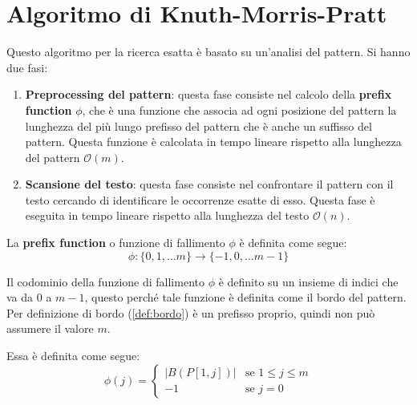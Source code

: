\section{Algoritmo di Knuth-Morris-Pratt}
Questo algoritmo per la ricerca esatta è basato su un'analisi del pattern. Si
hanno due fasi:
\begin{enumerate}
    \item \textbf{Preprocessing del pattern}: questa fase consiste nel calcolo
          della \textbf{prefix function} $\phi$, che è una funzione che associa
          ad ogni posizione del pattern la lunghezza del più lungo prefisso del
          pattern che è anche un suffisso del pattern. Questa funzione è calcolata
          in tempo lineare rispetto alla lunghezza del pattern $\mathcal{O}(m)$.
    \item \textbf{Scansione del testo}: questa fase consiste nel confrontare il
          pattern con il testo cercando di identificare le occorrenze esatte di
          esso. Questa fase è eseguita in tempo lineare rispetto alla lunghezza
          del testo $\mathcal{O}(n)$.
\end{enumerate}
La \textbf{prefix function} o funzione di fallimento $\phi$ è definita come segue:
\begin{equation}
    \phi: \{0, 1, \dots m\} \to \{-1, 0, \dots m - 1\}
\end{equation}
\begin{nota}
    Il codominio della funzione di fallimento $\phi$ è definito su un insieme di 
    indici che va da $0$ a $m - 1$, questo perché tale funzione è definita come 
    il bordo del pattern. Per definizione di bordo (\ref{def:bordo}) è un prefisso 
    proprio, quindi non può assumere il valore $m$.
\end{nota}
Essa è definita come segue:
\begin{equation}
    \phi(j) = \begin{cases}
        |B(P[1, j])| & \text{se } 1 \leq j \leq m \\
        -1           & \text{se } j = 0
    \end{cases}
\end{equation}
